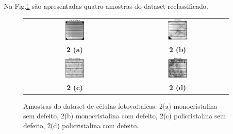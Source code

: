 \documentclass[conference]{IEEEtran}
\begin{document}
Na Fig.\ref{fig:amostras-dataset} são apresentadas quatro amostras do dataset
reclassificado.

\begin{figure}[htbp]
    \centering
    \begin{tabular}{cc}
        \includegraphics[width=0.20\textwidth]{images/mono-no-defect.png} &
        \includegraphics[width=0.20\textwidth]{images/mono-defect.png}
        \\
        \textbf{2 (a)}                                                    &
        \textbf{2 (b)}                                                      \\
        \includegraphics[width=0.20\textwidth]{images/poly-no-defect.png} &
        \includegraphics[width=0.20\textwidth]{images/poly-defect.png}
        \\
        \textbf{2 (c)}                                                    &
        \textbf{2 (d)}                                                      \\
    \end{tabular}
    \caption{Amostras do dataset de células fotovoltaicas: 2(a) monocristalina
        sem defeito, 2(b) monocristalina com defeito, 2(c) policristalina sem
        defeito,
        2(d) policristalina com defeito. \cite{Deitsch2021}}
    \label{fig:amostras-dataset}
\end{figure}
\end{document}
